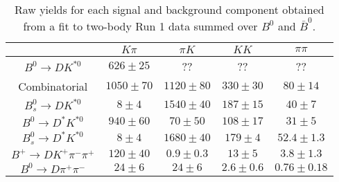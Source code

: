 \begin{table}
  \centering
  \begin{tabular}{ccccc}
      \toprule
       & $K\pi$ & $\pi K$ & $KK$ & $\pi\pi$ \\
      \midrule
      $B^0 \to DK^{*0}$ & $626 \pm 25$ & ?? & ?? & ?? \\
      Combinatorial & $1050 \pm 70$ & $1120 \pm 80$ & $330 \pm 30$ & $80 \pm 14$ \\
      $B^0_s \to DK^{*0}$ & $8 \pm 4$ & $1540 \pm 40$ & $187 \pm 15$ & $40 \pm 7$ \\
      $B^0 \to D^*K^{*0}$ & $940 \pm 60$ & $70 \pm 50$ & $108 \pm 17$ & $31 \pm 5$ \\
      $B^0_s \to D^*K^{*0}$ & $8 \pm 4$ & $1680 \pm 40$ & $179 \pm 4$ & $52.4 \pm 1.3$ \\
      $B^+ \to DK^+\pi^-\pi^+$ & $120 \pm 40$ & $0.9 \pm 0.3$ & $13 \pm 5$ & $3.8 \pm 1.3$ \\
      $B^0 \to D\pi^+\pi^-$ & $24 \pm 6$ & $24 \pm 6$ & $2.6 \pm 0.6$ & $0.76 \pm 0.18$ \\
      \bottomrule
      \end{tabular}
  \caption{Raw yields for each signal and background component obtained from a fit to two-body Run 1 data summed over $B^0$ and $\bar{B}^0$.}
\label{tab:yields_combined_2body_run1}
\end{table}
